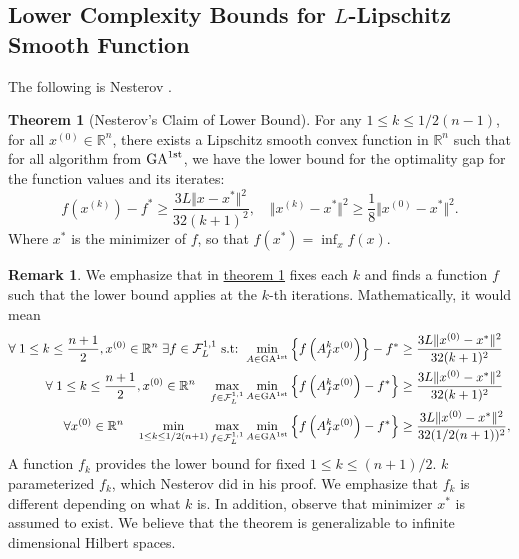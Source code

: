 \documentclass[]{article}
\theoremstyle{definition}
\newtheorem{theorem}{Theorem}[subsection]       %
\newtheorem{remark}{Remark}[subsection]
{
    \newtheorem{assumption}{Assumption}
}
\numberwithin{equation}{subsection}
\begin{document}
    \subsection{Lower Complexity Bounds for $L$-Lipschitz Smooth Function}
        The following is Nesterov \cite[Thm 2.1.7]{nesterov_lecture_2018}. 
        \begin{theorem}[Nesterov's Claim of Lower Bound]\label{thm:nesterov_lower_bnd}
            For any $1\le k \le 1/2(n - 1)$, for all $x^{(0)}\in \mathbb R^n$, there exists a Lipschitz smooth convex function in $\mathbb R^n$ such that for all algorithm from $\text{GA}^{\text{1st}}$, we have the lower bound for the optimality gap for the function values and its iterates: 
            \[
                f\left(x^{(k)}\right) - f^* \ge 
                \frac{3L \Vert x - x^*\Vert^2}{32(k + 1)^2}, 
                \quad \Vert x^{(k)} - x^*\Vert^2 \ge \frac{1}{8} \Vert x^{(0)} - x^*\Vert^2.     
            \]
            Where $x^*$ is the minimizer of $f$, so that $f(x^*) = \inf_{x}f(x)$. 
        \end{theorem}
        \begin{remark}
            We emphasize that in \hyperref[thm:nesterov_lower_bnd]{theorem \ref*{thm:nesterov_lower_bnd}} fixes each $k$ and finds a function $f$ such that the lower bound applies at the $k$-th iterations. 
            Mathematically, it would mean 
            \begin{align*}
                \forall\; 1\le k \le \frac{n + 1}{2}, x^{(0)} \in \mathbb R^n\; 
                \exists f \in \mathcal F^{1, 1}_L \text{ s.t: }
                \min_{A\in \text{GA}^{\text{1st}}} 
                \left\lbrace
                    f\left(A_f^k x^{(0)}\right)
                \right\rbrace - f^* 
                &\ge 
                \frac{3L \Vert x^{(0)} - x^*\Vert^2}{32(k + 1)^2}
                \\
                \forall\; 1\le k \le \frac{n + 1}{2}, x^{(0)} \in \mathbb R^n
                \quad
                \max_{f\in \mathcal F_L^{1,1}}
                \min_{A\in \text{GA}^{\text{1st}}} 
                \left\lbrace
                    f\left(A_f^k x^{(0)}\right) - f^*  
                \right\rbrace 
                &\ge 
                \frac{3L \Vert x^{(0)} - x^*\Vert^2}{32(k + 1)^2}
                \\
                \forall
                x^{(0)} \in \mathbb R^n \quad 
                \min_{1 \le k \le 1/2 (n + 1)}
                \max_{f\in \mathcal F_L^{1, 1}}
                \min_{ A \in \text{GA}^{\text{1st}}}
                \left\lbrace
                    f\left(A_f^kx^{(0)}\right) - f^*
                \right\rbrace
                & \ge 
                \frac{3L \Vert x^{(0)} - x^*\Vert^2}{32(1/2(n + 1))^2}, 
            \end{align*}
            A function $f_k$ provides the lower bound for fixed $1 \le k \le (n+ 1)/2$. 
            $k$ parameterized $f_k$, which Nesterov did in his proof. 
            We emphasize that $f_k$ is different depending on what $k$ is. 
            In addition, observe that minimizer $x^*$ is assumed to exist. 
            We believe that the theorem is generalizable to infinite dimensional Hilbert spaces. 
        \end{remark}
\end{document}
